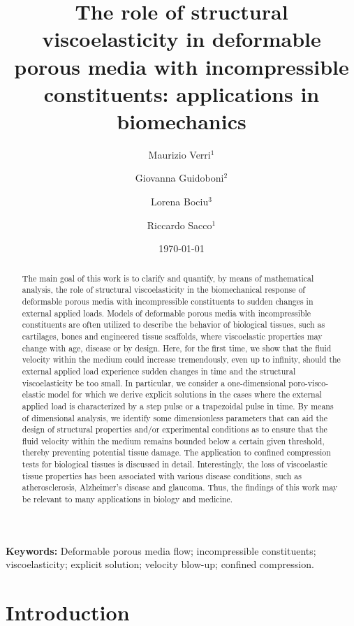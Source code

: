 \documentclass[12pt,a4paper]{amsart}
\title[The role of viscoelasticity in deformable porous media]
{The role of structural viscoelasticity in deformable porous media with incompressible
constituents: applications in biomechanics}
\author{Maurizio Verri$^{1}$ \and Giovanna Guidoboni$^{2}$ \and Lorena Bociu$^{3}$
\and Riccardo Sacco$^{1}$}
\theoremstyle{definition}
\begin{document}
\date{\today}

\begin{abstract}
The main goal of this work is to clarify and quantify, by means of mathematical analysis, the role of structural viscoelasticity in the biomechanical response of deformable porous media 
with incompressible constituents to sudden changes in external applied loads. 
Models of deformable porous media with incompressible constituents
are often utilized to describe the behavior of biological tissues, such as cartilages, bones and engineered tissue scaffolds, where viscoelastic properties may change with age, disease or by design. Here, for the first time, we show that the fluid velocity within the medium could increase tremendously, even up to infinity, should the external applied load experience sudden changes in time and the structural viscoelasticity be too small. In particular, we consider a one-dimensional poro-visco-elastic model
for which we derive explicit solutions in the cases where the external applied load is characterized by a step pulse or a trapezoidal pulse in time. By means of dimensional analysis, we identify some dimensionless parameters that can aid the design of structural properties and/or experimental conditions as to ensure that the fluid velocity within the medium remains bounded below a certain given threshold, thereby preventing potential tissue damage. The application to confined compression tests for biological tissues is discussed in detail. Interestingly, the loss of viscoelastic tissue properties has been associated with various disease conditions, such as atherosclerosis, Alzheimer's disease and glaucoma. Thus, the findings of this work may be relevant to many applications in biology and medicine.
\end{abstract}

\maketitle

{\bf Keywords:}
Deformable porous media flow; incompressible constituents; viscoelasticity; 
explicit solution; velocity blow-up; confined compression.

\section{Introduction}
\label{sec:intro}
\end{document}
